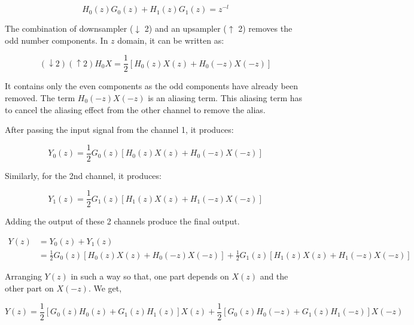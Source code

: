 \begin{equation} \label{eqn:basic_tr}
{H_{0}(z)G_{0}(z) + H_{1}(z)G_{1}(z) = z^{-l}}
\end{equation}


The combination of downsampler ($\downarrow$ 2) and an upsampler ($\uparrow$ 2) removes the odd number components. In $z$ domain, it can be written as:

\begin{equation} \label{eqn_wavelet_transform}
{(\downarrow 2)(\uparrow 2)H_{0}X = \frac{1}{2}[H_{0}(z)X(z) + H_{0}(-z)X(-z)]}
\end{equation}

It contains only the even components as the odd components have already been removed. The term $H_{0}(-z)X(-z)$ is an aliasing term. This aliasing term has to cancel the aliasing effect from the other channel to remove the alias.


After passing the input signal from the channel 1, it produces:

\begin{equation} \label{eqn_wavelet_transform}
{Y_{0}(z) = \frac{1}{2}G_{0}(z)[H_{0}(z)X(z) + H_{0}(-z)X(-z)]}
\end{equation}

Similarly, for the 2nd channel, it produces:


\begin{equation} \label{eqn_wavelet_transform}
{Y_{1}(z) = \frac{1}{2}G_{1}(z)[H_{1}(z)X(z) + H_{1}(-z)X(-z)]}
\end{equation}

Adding the output of these 2 channels produce the final output.



\begin{equation} \label{eq1}
\begin{split}
Y(z)  &= Y_{0}(z) + Y_{1}(z) \\
&= \frac{1}{2}G_{0}(z)[H_{0}(z)X(z) + H_{0}(-z)X(-z)] + \frac{1}{2}G_{1}(z)[H_{1}(z)X(z) + H_{1}(-z)X(-z)]
\end{split}
\end{equation}


Arranging $Y(z)$ in such a way so that, one part depends on $X(z)$ and the other part on $X(-z)$. We get,

\begin{equation} \label{eqn:cmp}
{Y(z) = \frac{1}{2}[G_{0}(z)H_{0}(z) + G_{1}(z)H_{1}(z)]X(z) + \frac{1}{2}[G_{0}(z)H_{0}(-z) + G_{1}(z)H_{1}(-z)]X(-z)}
\end{equation}

